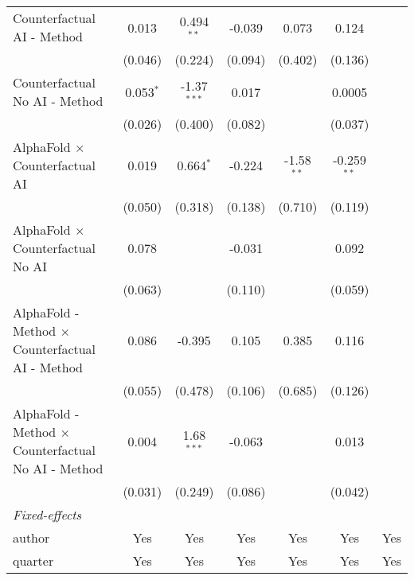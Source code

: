 \begin{tabular}{lcccccc}
   Counterfactual AI - Method                                 & 0.013       & 0.494$^{**}$  & -0.039  & 0.073         & 0.124         &   \\   
                                                              & (0.046)     & (0.224)       & (0.094) & (0.402)       & (0.136)       &   \\   
   Counterfactual No AI - Method                              & 0.053$^{*}$ & -1.37$^{***}$ & 0.017   &               & 0.0005        &   \\   
                                                              & (0.026)     & (0.400)       & (0.082) &               & (0.037)       &   \\   
   AlphaFold $\times$ Counterfactual AI                       & 0.019       & 0.664$^{*}$   & -0.224  & -1.58$^{**}$  & -0.259$^{**}$ &   \\   
                                                              & (0.050)     & (0.318)       & (0.138) & (0.710)       & (0.119)       &   \\   
   AlphaFold $\times$ Counterfactual No AI                    & 0.078       &               & -0.031  &               & 0.092         &   \\   
                                                              & (0.063)     &               & (0.110) &               & (0.059)       &   \\   
   AlphaFold - Method $\times$ Counterfactual AI - Method     & 0.086       & -0.395        & 0.105   & 0.385         & 0.116         &   \\   
                                                              & (0.055)     & (0.478)       & (0.106) & (0.685)       & (0.126)       &   \\   
   AlphaFold - Method $\times$ Counterfactual No AI - Method  & 0.004       & 1.68$^{***}$  & -0.063  &               & 0.013         &   \\   
                                                              & (0.031)     & (0.249)       & (0.086) &               & (0.042)       &   \\   
   \midrule
   \emph{Fixed-effects}\\
   author                                                     & Yes         & Yes           & Yes     & Yes           & Yes           & Yes\\  
   quarter                                                    & Yes         & Yes           & Yes     & Yes           & Yes           & Yes\\  

\end{tabular}
